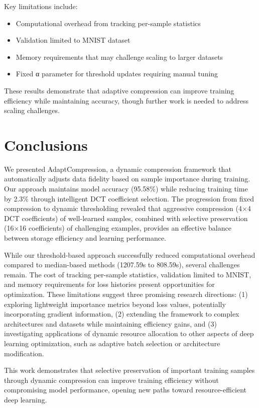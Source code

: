 \documentclass{article} %
\begin{document}
Key limitations include:
\begin{itemize}
    \item Computational overhead from tracking per-sample statistics
    \item Validation limited to MNIST dataset
    \item Memory requirements that may challenge scaling to larger datasets
    \item Fixed α parameter for threshold updates requiring manual tuning
\end{itemize}

These results demonstrate that adaptive compression can improve training efficiency while maintaining accuracy, though further work is needed to address scaling challenges.


\section{Conclusions}
\label{sec:conclusion}

We presented AdaptCompression, a dynamic compression framework that automatically adjusts data fidelity based on sample importance during training. Our approach maintains model accuracy (95.58\%) while reducing training time by 2.3\% through intelligent DCT coefficient selection. The progression from fixed compression to dynamic thresholding revealed that aggressive compression (4$\times$4 DCT coefficients) of well-learned samples, combined with selective preservation (16$\times$16 coefficients) of challenging examples, provides an effective balance between storage efficiency and learning performance.

While our threshold-based approach successfully reduced computational overhead compared to median-based methods (1207.59s to 808.59s), several challenges remain. The cost of tracking per-sample statistics, validation limited to MNIST, and memory requirements for loss histories present opportunities for optimization. These limitations suggest three promising research directions: (1) exploring lightweight importance metrics beyond loss values, potentially incorporating gradient information, (2) extending the framework to complex architectures and datasets while maintaining efficiency gains, and (3) investigating applications of dynamic resource allocation to other aspects of deep learning optimization, such as adaptive batch selection or architecture modification.

This work demonstrates that selective preservation of important training samples through dynamic compression can improve training efficiency without compromising model performance, opening new paths toward resource-efficient deep learning.



\end{document}
